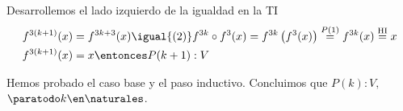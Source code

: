 Desarrollemos el lado izquierdo de la igualdad en la TI
\begin{align*}
  f^{3(k+1)}(x) & = f^{3k+3}(x) \igual{(2)} f^{3k} \circ f^3(x) = f^{3k}\left( f^3(x)\right)
  \overset{P(1)}{=} f^{3k}(x) \overset{\text{HI}}{=} x                                       \\
  f^{3(k+1)}(x) & = x \entonces P(k+1):V
\end{align*}

Hemos probado el caso base y el paso inductivo. Concluimos que $P(k):V,$ $\paratodo k \en \naturales $.

\begin{aportes}
  \item {}
\end{aportes}
